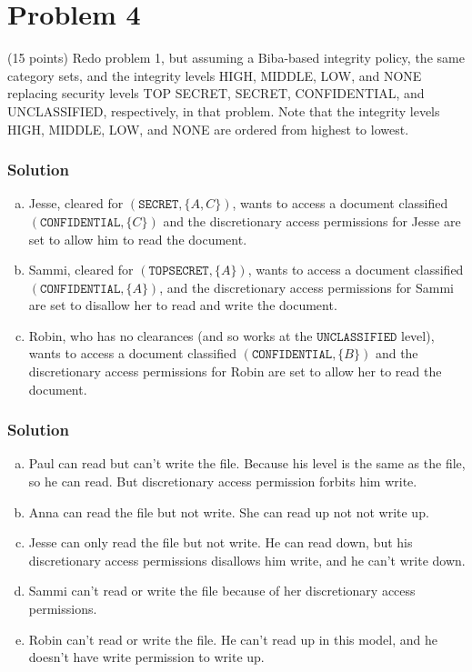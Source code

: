 \section*{Problem 4}
 (15 points) Redo problem 1, but assuming a Biba-based integrity policy, the same category sets, and the integrity levels HIGH, MIDDLE, LOW, and NONE replacing security levels TOP SECRET, SECRET, CONFIDENTIAL, and UNCLASSIFIED, respectively, in that problem.
Note that the integrity levels HIGH, MIDDLE, LOW, and NONE are ordered from highest to lowest.

\subsubsection*{Solution}


\begin{enumerate}[(a)]
    \item Jesse, cleared for $(\texttt{SECRET}, \{ A, C \})$, wants to access a document classified $(\texttt{CONFIDENTIAL}, \{ C \})$ and the discretionary access permissions for Jesse are set to allow him to read the document.

    \item Sammi, cleared for $(\texttt{TOPSECRET}, \{ A \})$, wants to access a document classified $(\texttt{CONFIDENTIAL}, \{ A \})$, and the discretionary access permissions for Sammi are set to disallow her to read and write the document.

    \item Robin, who has no clearances (and so works at the $\texttt{UNCLASSIFIED}$ level), wants to access a document classified $(\texttt{CONFIDENTIAL}, \{ B \})$ and the discretionary access permissions for Robin are set to allow her to read the document.
\end{enumerate}

\subsubsection*{Solution}

\begin{enumerate}[(a)]
    \item Paul can read but can't write the file. Because his level is the same as the file, so he can read. But discretionary access permission forbits him write.
    \item Anna can read the file but not write. She can read up not not write up.
    \item Jesse can only read the file but not write. He can read down, but his discretionary access permissions disallows him write, and he can't write down.
    \item Sammi can't read or write the file because of her discretionary access permissions.
    \item Robin can't read or write the file. He can't read up in this model, and he doesn't have write permission to write up.
\end{enumerate}